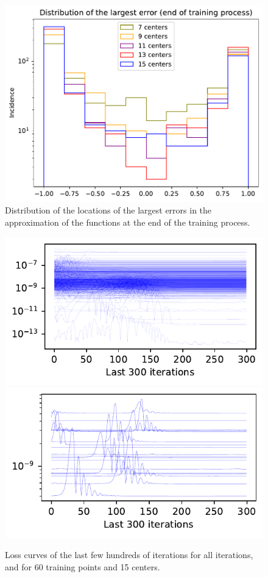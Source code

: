 \documentclass[12pt]{report} %
\begin{document}
\begin{figure}[h]
  \includegraphics[width=.7\textwidth]{imagenes/experiments/1d/statistical_1d_full_scheduler_interpolation/distribution_of_errors_L_inf_end.pdf}
  \caption{Distribution of the locations of the largest errors in the approximation of the functions at the end of the training process.}
  \label{fig:u2-results-largest-error}
\end{figure}

\begin{figure}[h]
  \includegraphics[width=.7\textwidth]{imagenes/experiments/1d/statistical_1d_full_scheduler_interpolation/last_few_all_with_Poly.pdf}
  \includegraphics[width=.7\textwidth]{imagenes/experiments/1d/statistical_1d_full_scheduler_interpolation/last_few_TR60_C15.pdf}
  \caption{Loss curves of the last few hundreds of iterations for all iterations, and for 60 training points and 15 centers.}
  \label{fig:u2-results-last-iterations}
\end{figure}
\end{document}
